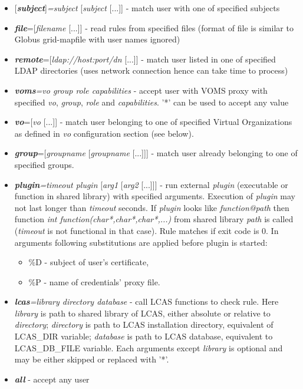 \documentclass{article}
\begin{document}
\begin{itemize}
\item {[}\textbf{\textit{subject}}{]}\textit{=subject}
  {[}\textit{subject} {[}...{]}{]} - match user with one of specified
  subjects
\item \textbf{\textit{file}}={[}\textit{filename} {[}...{]}{]} - read
  rules from specified files (format of file is similar to Globus
  grid-mapfile with user names ignored)
\item \textbf{\textit{remote}}={[}\textit{ldap://host:port/dn}
  {[}...{]}{]} - match user listed in one of specified LDAP
  directories (uses network connection hence can take time to process)
\item \textbf{\textit{voms}}\textit{=vo group role capabilities} -
  accept user with VOMS proxy with specified \textit{vo},
  \textit{group}, \textit{role} and \textit{capabilities}. '{*}' can
  be used to accept any value
\item \textbf{\textit{vo}}={[}\textit{vo} {[}...{]}{]} - match user
  belonging to one of specified Virtual Organizations as defined in
  \emph{vo} configuration section (see below).
\item \textbf{\textit{group}}={[}\textit{groupname}
  {[}\textit{groupname} {[}...{]}{]}{]} - match user already belonging
  to one of specified groups.
\item \textbf{\textit{plugin}}\textit{=timeout plugin}
  {[}\textit{arg1} {[}\textit{arg2} {[}...{]}{]}{]} - run external
  \emph{plugin} (executable or function in shared library) with
  specified arguments. Execution of \emph{plugin} may not last longer
  than \emph{timeout} seconds.  If \emph{plugin} looks like
  \emph{function@path} then function \emph{int
    function(char{*},char{*},char{*},...)} from shared library
  \emph{path} is called (\emph{timeout} is not functional in that
  case). Rule matches if exit code is 0. In arguments following
  substitutions are applied before plugin is started:

\begin{itemize}
\item \%D - subject of user's certificate,
\item \%P - name of credentials' proxy file.
\end{itemize}

\item \textbf{\textit{lcas}}\textit{=library directory database} -
  call LCAS functions to check rule. Here \textit{library} is path to
  shared library of LCAS, either absolute or relative to
  \textit{directory}; \textit{directory} is path to LCAS installation
  directory, equivalent of LCAS\_DIR variable; \textit{database} is
  path to LCAS database, equivalent to LCAS\_DB\_FILE variable. Each
  arguments except \textit{library} is optional and may be either
  skipped or replaced with '{*}'.
\item \textbf{\textit{all}} - accept any user
\end{itemize}
\end{document}
